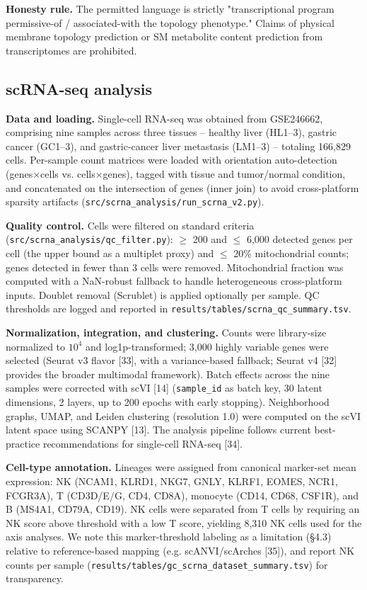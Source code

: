 \documentclass[modern,large,numbered,nocrop]{oup-authoring-template}
\begin{document}
\textbf{Honesty rule.} The permitted language is strictly "transcriptional program permissive-of / associated-with the topology phenotype." Claims of physical membrane topology prediction or SM metabolite content prediction from transcriptomes are prohibited.

\subsection{scRNA-seq analysis}

\textbf{Data and loading.} Single-cell RNA-seq was obtained from GSE246662, comprising nine samples across three tissues -- healthy liver (HL1--3), gastric cancer (GC1--3), and gastric-cancer liver metastasis (LM1--3) -- totaling 166,829 cells. Per-sample count matrices were loaded with orientation auto-detection (genes$\times$cells vs. cells$\times$genes), tagged with tissue and tumor/normal condition, and concatenated on the intersection of genes (inner join) to avoid cross-platform sparsity artifacts (\texttt{src/scrna\_analysis/run\_scrna\_v2.py}).

\textbf{Quality control.} Cells were filtered on standard criteria (\texttt{src/scrna\_analysis/qc\_filter.py}): $\geq$ 200 and $\leq$ 6,000 detected genes per cell (the upper bound as a multiplet proxy) and $\leq$ 20\% mitochondrial counts; genes detected in fewer than 3 cells were removed. Mitochondrial fraction was computed with a NaN-robust fallback to handle heterogeneous cross-platform inputs. Doublet removal (Scrublet) is applied optionally per sample. QC thresholds are logged and reported in \texttt{results/tables/scrna\_qc\_summary.tsv}.

\textbf{Normalization, integration, and clustering.} Counts were library-size normalized to $10^{4}$ and log1p-transformed; 3,000 highly variable genes were selected (Seurat v3 flavor [33], with a variance-based fallback; Seurat v4 [32] provides the broader multimodal framework). Batch effects across the nine samples were corrected with scVI [14] (\texttt{sample\_id} as batch key, 30 latent dimensions, 2 layers, up to 200 epochs with early stopping). Neighborhood graphs, UMAP, and Leiden clustering (resolution 1.0) were computed on the scVI latent space using SCANPY [13]. The analysis pipeline follows current best-practice recommendations for single-cell RNA-seq [34].

\textbf{Cell-type annotation.} Lineages were assigned from canonical marker-set mean expression: NK (NCAM1, KLRD1, NKG7, GNLY, KLRF1, EOMES, NCR1, FCGR3A), T (CD3D/E/G, CD4, CD8A), monocyte (CD14, CD68, CSF1R), and B (MS4A1, CD79A, CD19). NK cells were separated from T cells by requiring an NK score above threshold with a low T score, yielding 8,310 NK cells used for the axis analyses. We note this marker-threshold labeling as a limitation (\S{}4.3) relative to reference-based mapping (e.g. scANVI/scArches [35]), and report NK counts per sample (\texttt{results/tables/gc\_scrna\_dataset\_summary.tsv}) for transparency.
\end{document}
